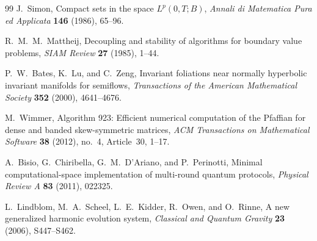 \documentclass[11pt]{article}
\numberwithin{equation}{section}
\theoremstyle{definition}
\theoremstyle{remark}
\begin{document}
\begin{thebibliography}{99}
J.~Simon,
\newblock Compact sets in the space $L^p(0,T;B)$,
\newblock \emph{Annali di Matematica Pura ed Applicata}
\textbf{146} (1986), 65--96.

R.~M.~M.~Mattheij,
\newblock Decoupling and stability of algorithms for boundary value problems,
\newblock \emph{SIAM Review} \textbf{27} (1985), 1--44.

P.~W.~Bates, K.~Lu, and C.~Zeng,
\newblock Invariant foliations near normally hyperbolic invariant manifolds
for semiflows,
\newblock \emph{Transactions of the American Mathematical Society}
\textbf{352} (2000), 4641--4676.


M.~Wimmer,
\newblock Algorithm 923: Efficient numerical computation of the Pfaffian for
 dense and banded skew-symmetric matrices,
\newblock \emph{ACM Transactions on Mathematical Software} \textbf{38}
 (2012), no.~4, Article~30, 1--17.

A.~Bisio, G.~Chiribella, G.~M.~D'Ariano, and P.~Perinotti,
\newblock Minimal computational-space implementation of multi-round quantum protocols,
\newblock \emph{Physical Review A} \textbf{83} (2011), 022325.

L.~Lindblom, M.~A.~Scheel, L.~E.~Kidder, R.~Owen, and O.~Rinne,
\newblock A new generalized harmonic evolution system,
\newblock \emph{Classical and Quantum Gravity} \textbf{23} (2006), S447--S462.

\end{thebibliography}

\end{document}
